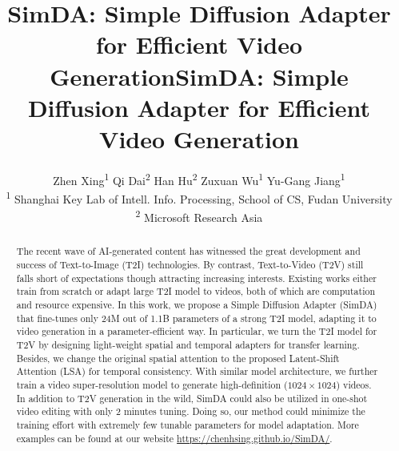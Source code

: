 \title{SimDA: Simple Diffusion Adapter for Efficient Video Generation}



\title{SimDA: Simple Diffusion Adapter for Efficient Video Generation}

\author{Zhen Xing\textsuperscript{1} \authorskip Qi Dai\textsuperscript{2} \authorskip Han Hu\textsuperscript{2}  \authorskip Zuxuan Wu\textsuperscript{1} \authorskip Yu-Gang Jiang\textsuperscript{1} \\[0.5mm]
{
\textsuperscript{1}  Shanghai Key Lab of Intell. Info. Processing, School of CS, Fudan University}\\ 
{\textsuperscript{2} Microsoft Research Asia}
}


\begin{abstract}
The recent wave of AI-generated content has witnessed the great development and success of Text-to-Image (T2I) technologies.
By contrast, Text-to-Video (T2V) still falls short of expectations though attracting increasing interests.
Existing works either train from scratch or adapt large T2I model to videos, both of which are computation and resource expensive.
In this work, we propose a Simple Diffusion Adapter (SimDA) that fine-tunes only 24M out of 1.1B parameters of a strong T2I model, adapting it to video generation in a parameter-efficient way.
In particular, we turn the T2I model for T2V by designing light-weight spatial and temporal adapters for transfer learning. Besides, we change the original spatial attention to the proposed Latent-Shift Attention (LSA) for temporal consistency. With similar model architecture, we further train a video super-resolution model to generate high-definition ($1024 \times 1024$) videos. In addition to T2V generation in the wild, SimDA could also be utilized in one-shot video editing with only 2 minutes tuning. Doing so, our method could minimize the training effort with extremely few tunable parameters for model adaptation.
More examples can be found at our website \url{https://chenhsing.github.io/SimDA/}. 
\end{abstract}

